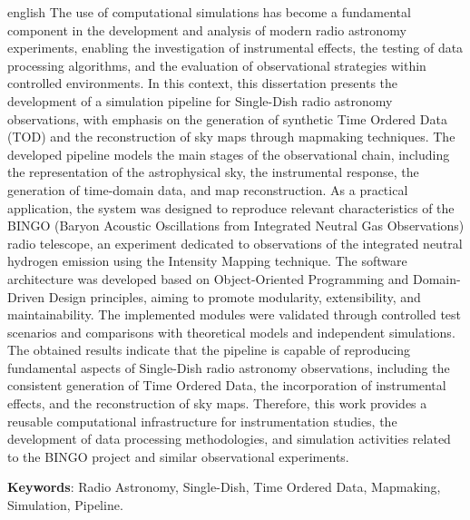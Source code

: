 
\begin{resumo}[Abstract]
\begin{otherlanguage*}{english}
	The use of computational simulations has become a fundamental component in the development and analysis of modern radio astronomy experiments, enabling the investigation of instrumental effects, the testing of data processing algorithms, and the evaluation of observational strategies within controlled environments. In this context, this dissertation presents the development of a simulation pipeline for Single-Dish radio astronomy observations, with emphasis on the generation of synthetic Time Ordered Data (TOD) and the reconstruction of sky maps through mapmaking techniques.
The developed pipeline models the main stages of the observational chain, including the representation of the astrophysical sky, the instrumental response, the generation of time-domain data, and map reconstruction. As a practical application, the system was designed to reproduce relevant characteristics of the BINGO (Baryon Acoustic Oscillations from Integrated Neutral Gas Observations) radio telescope, an experiment dedicated to observations of the integrated neutral hydrogen emission using the Intensity Mapping technique.
The software architecture was developed based on Object-Oriented Programming and Domain-Driven Design principles, aiming to promote modularity, extensibility, and maintainability. The implemented modules were validated through controlled test scenarios and comparisons with theoretical models and independent simulations.
The obtained results indicate that the pipeline is capable of reproducing fundamental aspects of Single-Dish radio astronomy observations, including the consistent generation of Time Ordered Data, the incorporation of instrumental effects, and the reconstruction of sky maps. Therefore, this work provides a reusable computational infrastructure for instrumentation studies, the development of data processing methodologies, and simulation activities related to the BINGO project and similar observational experiments.

	
\vspace{\onelineskip}
	\noindent 
	\textbf{Keywords}: Radio Astronomy, Single-Dish, Time Ordered Data, Mapmaking, Simulation, Pipeline.
\end{otherlanguage*}
\end{resumo}